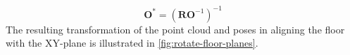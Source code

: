 \begin{equation} %
    \mathbf{O}^* = \left(\mathbf{R} \mathbf{O}^{-1} \right)^{-1}
\end{equation}
The resulting transformation of the point cloud and poses in aligning the floor with the XY-plane is illustrated in \cref{fig:rotate-floor-planes}.





